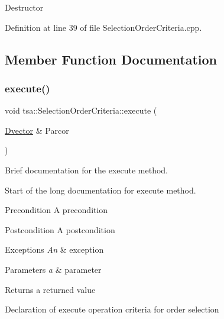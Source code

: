 Destructor 

Definition at line 39 of file Selection\+Order\+Criteria.\+cpp.



\subsection{Member Function Documentation}
\mbox{\label{classtsa_1_1_selection_order_criteria_a0ad59c956379f34330a85284ba28cffa}} 
\subsubsection{\texorpdfstring{execute()}{execute()}}
{\footnotesize\ttfamily void tsa\+::\+Selection\+Order\+Criteria\+::execute (\begin{DoxyParamCaption}\item[{\hyperlink{namespacetsa_a8900fb03d849baf447a1a0efe2561fb2}{Dvector} \&}]{Parcor }\end{DoxyParamCaption})}



Brief documentation for the execute method. 

Start of the long documentation for execute method.

\begin{DoxyPrecond}{Precondition}
A precondition 
\end{DoxyPrecond}
\begin{DoxyPostcond}{Postcondition}
A postcondition 
\end{DoxyPostcond}

\begin{DoxyExceptions}{Exceptions}
{\em An} & exception\\
\hline
\end{DoxyExceptions}

\begin{DoxyParams}{Parameters}
{\em a} & parameter\\
\hline
\end{DoxyParams}
\begin{DoxyReturn}{Returns}
a returned value
\end{DoxyReturn}
Declaration of execute operation criteria for order selection 

